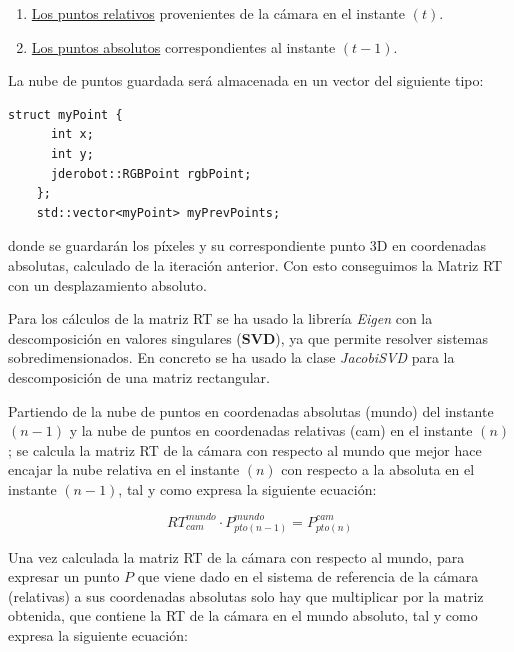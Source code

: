\begin{enumerate}
\item \underline{Los puntos relativos} provenientes de la cámara en el instante $(t)$.
\item \underline{Los puntos absolutos} correspondientes al instante $(t-1)$.
\end{enumerate}

La nube de puntos guardada será almacenada en un vector del siguiente tipo:

\begin{lstlisting}[style=CStyle]
    struct myPoint {
      int x;
      int y;
      jderobot::RGBPoint rgbPoint;
    };
    std::vector<myPoint> myPrevPoints;
\end{lstlisting}

donde se guardarán los píxeles y su correspondiente punto 3D en coordenadas absolutas, calculado de la iteración anterior. Con esto conseguimos la Matriz RT con un desplazamiento absoluto.

Para los cálculos de la matriz RT se ha usado la librería \textit{Eigen} con la descomposición en valores singulares (\textbf{SVD}), ya que permite resolver sistemas sobredimensionados. En concreto se ha usado la clase \textit{JacobiSVD} para la descomposición de una matriz rectangular.

Partiendo de la nube de puntos en coordenadas absolutas (mundo) del instante $(n-1)$ y la nube de puntos en coordenadas relativas (cam) en el instante $(n)$; se calcula la matriz RT de la cámara con respecto al mundo que mejor hace encajar la nube relativa en el instante $(n)$ con respecto a la absoluta en el instante $(n-1)$, tal y como expresa la siguiente ecuación:


\begin{equation}
RT_{cam}^{mundo}\cdot P_{pto(n-1)}^{mundo}=P_{pto(n)}^{cam}
\end{equation}

Una vez calculada la matriz RT de la cámara con respecto al mundo, para expresar un punto $P$ que viene dado en el sistema de referencia de la cámara (relativas) a sus coordenadas absolutas solo hay que multiplicar por la matriz obtenida, que contiene la RT de la cámara en el mundo absoluto, tal y como expresa la siguiente ecuación:

